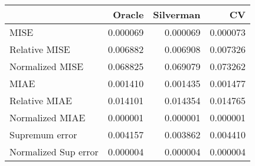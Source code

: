\begin{tabular}{lrrr}
  \toprule
 & Oracle & Silverman & CV \\ 
  \midrule
MISE & 0.000069 & 0.000069 & 0.000073 \\ 
  Relative MISE & 0.006882 & 0.006908 & 0.007326 \\ 
  Normalized MISE & 0.068825 & 0.069079 & 0.073262 \\ 
  MIAE & 0.001410 & 0.001435 & 0.001477 \\ 
  Relative MIAE & 0.014101 & 0.014354 & 0.014765 \\ 
  Normalized MIAE & 0.000001 & 0.000001 & 0.000001 \\ 
  Supremum error & 0.004157 & 0.003862 & 0.004410 \\ 
  Normalized Sup error & 0.000004 & 0.000004 & 0.000004 \\ 
   \bottomrule
\end{tabular}
